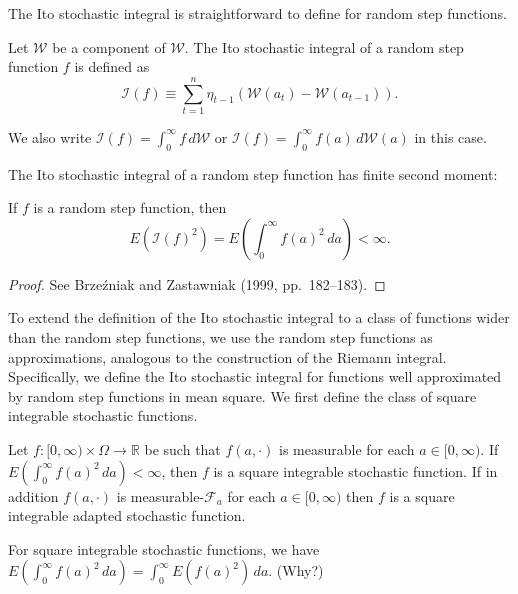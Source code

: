 The Ito stochastic integral is straightforward to define for random step functions.

\begin{definition}\label{def:ito-step}
Let $\mathcal{W}$ be a component of $\boldsymbol{\mathcal{W}}$. The Ito stochastic integral of a random step function $f$ is defined as
\[
\mathcal{I}(f) \equiv \sum_{t=1}^{n} \eta_{t-1}(\mathcal{W}(a_t) - \mathcal{W}(a_{t-1})).
\]
\end{definition}

We also write $\mathcal{I}(f) = \int_0^{\infty} f\,d\mathcal{W}$ or $\mathcal{I}(f) = \int_0^{\infty} f(a)\,d\mathcal{W}(a)$ in this case.

The Ito stochastic integral of a random step function has finite second moment:

\begin{proposition}\label{prop:ito-step-moment}
If $f$ is a random step function, then
\[
E(\mathcal{I}(f)^2) = E\!\left(\int_0^{\infty} f(a)^2\,da\right) < \infty.
\]
\end{proposition}

\begin{proof}
See Brze\'{z}niak and Zastawniak (1999, pp.\ 182--183).
\end{proof}

To extend the definition of the Ito stochastic integral to a class of functions wider than the random step functions, we use the random step functions as approximations, analogous to the construction of the Riemann integral. Specifically, we define the Ito stochastic integral for functions well approximated by random step functions in mean square. We first define the class of square integrable stochastic functions.

\begin{definition}\label{def:sq-integrable}
Let $f : [0,\infty) \times \Omega \to \mathbb{R}$ be such that $f(a, \cdot)$ is measurable for each $a \in [0,\infty)$. If $E\!\left(\int_0^{\infty} f(a)^2\,da\right) < \infty$, then $f$ is a square integrable stochastic function. If in addition $f(a, \cdot)$ is measurable-$\mathcal{F}_a$ for each $a \in [0,\infty)$ then $f$ is a square integrable adapted stochastic function.
\end{definition}

For square integrable stochastic functions, we have $E\!\left(\int_0^{\infty} f(a)^2\,da\right) = \int_0^{\infty} E\!\left(f(a)^2\right)\,da$. (Why?)


